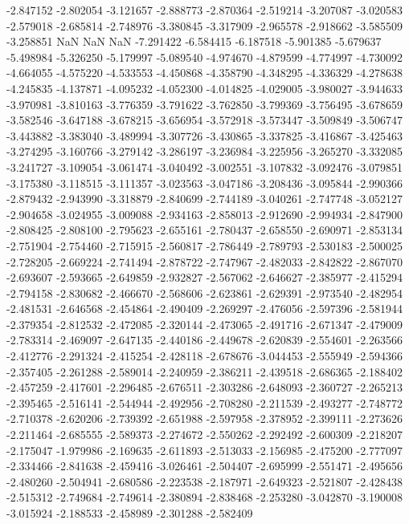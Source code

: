 -2.847152
-2.802054
-3.121657
-2.888773
-2.870364
-2.519214
-3.207087
-3.020583
-2.579018
-2.685814
-2.748976
-3.380845
-3.317909
-2.965578
-2.918662
-3.585509
-3.258851
NaN
NaN
NaN
-7.291422
-6.584415
-6.187518
-5.901385
-5.679637
-5.498984
-5.326250
-5.179997
-5.089540
-4.974670
-4.879599
-4.774997
-4.730092
-4.664055
-4.575220
-4.533553
-4.450868
-4.358790
-4.348295
-4.336329
-4.278638
-4.245835
-4.137871
-4.095232
-4.052300
-4.014825
-4.029005
-3.980027
-3.944633
-3.970981
-3.810163
-3.776359
-3.791622
-3.762850
-3.799369
-3.756495
-3.678659
-3.582546
-3.647188
-3.678215
-3.656954
-3.572918
-3.573447
-3.509849
-3.506747
-3.443882
-3.383040
-3.489994
-3.307726
-3.430865
-3.337825
-3.416867
-3.425463
-3.274295
-3.160766
-3.279142
-3.286197
-3.236984
-3.225956
-3.265270
-3.332085
-3.241727
-3.109054
-3.061474
-3.040492
-3.002551
-3.107832
-3.092476
-3.079851
-3.175380
-3.118515
-3.111357
-3.023563
-3.047186
-3.208436
-3.095844
-2.990366
-2.879432
-2.943990
-3.318879
-2.840699
-2.744189
-3.040261
-2.747748
-3.052127
-2.904658
-3.024955
-3.009088
-2.934163
-2.858013
-2.912690
-2.994934
-2.847900
-2.808425
-2.808100
-2.795623
-2.655161
-2.780437
-2.658550
-2.690971
-2.853134
-2.751904
-2.754460
-2.715915
-2.560817
-2.786449
-2.789793
-2.530183
-2.500025
-2.728205
-2.669224
-2.741494
-2.878722
-2.747967
-2.482033
-2.842822
-2.867070
-2.693607
-2.593665
-2.649859
-2.932827
-2.567062
-2.646627
-2.385977
-2.415294
-2.794158
-2.830682
-2.466670
-2.568606
-2.623861
-2.629391
-2.973540
-2.482954
-2.481531
-2.646568
-2.454864
-2.490409
-2.269297
-2.476056
-2.597396
-2.581944
-2.379354
-2.812532
-2.472085
-2.320144
-2.473065
-2.491716
-2.671347
-2.479009
-2.783314
-2.469097
-2.647135
-2.440186
-2.449678
-2.620839
-2.554601
-2.263566
-2.412776
-2.291324
-2.415254
-2.428118
-2.678676
-3.044453
-2.555949
-2.594366
-2.357405
-2.261288
-2.589014
-2.240959
-2.386211
-2.439518
-2.686365
-2.188402
-2.457259
-2.417601
-2.296485
-2.676511
-2.303286
-2.648093
-2.360727
-2.265213
-2.395465
-2.516141
-2.544944
-2.492956
-2.708280
-2.211539
-2.493277
-2.748772
-2.710378
-2.620206
-2.739392
-2.651988
-2.597958
-2.378952
-2.399111
-2.273626
-2.211464
-2.685555
-2.589373
-2.274672
-2.550262
-2.292492
-2.600309
-2.218207
-2.175047
-1.979986
-2.169635
-2.611893
-2.513033
-2.156985
-2.475200
-2.777097
-2.334466
-2.841638
-2.459416
-3.026461
-2.504407
-2.695999
-2.551471
-2.495656
-2.480260
-2.504941
-2.680586
-2.223538
-2.187971
-2.649323
-2.521807
-2.428438
-2.515312
-2.749684
-2.749614
-2.380894
-2.838468
-2.253280
-3.042870
-3.190008
-3.015924
-2.188533
-2.458989
-2.301288
-2.582409
